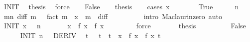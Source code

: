 \begin{isabellebody}
\ INIT\ \isamarkupfalse%
\ {\isacharquery}{\kern0pt}thesis\ \isamarkupfalse%
\ force\isanewline
{}\isamarkupfalse%
\isanewline
\ \ \isamarkupfalse%
\ False\isanewline
\ \ \isamarkupfalse%
\ {\isacharquery}{\kern0pt}thesis\isanewline
\ \ \isamarkupfalse%
\ {\isacharparenleft}{\kern0pt}cases\ {\isachardoublequoteopen}x\ {\isacharequal}{\kern0pt}\ {}{\isachardoublequoteclose}{\isacharparenright}{\kern0pt}\isanewline
\ \ \ \ \isamarkupfalse%
\ True\isanewline
\ \ \ \ \isamarkupfalse%
\ {\isacartoucheopen}n\ {\isasymnoteq}\ {}{\isacartoucheclose}\ \isamarkupfalse%
\ {\isachardoublequoteopen}{\isacharparenleft}{\kern0pt}{\isasymSum}m{\isacharless}{\kern0pt}n{\isachardot}{\kern0pt}\ diff\ m\ {}\ {\isacharslash}{\kern0pt}\ {\isacharparenleft}{\kern0pt}fact\ m{\isacharparenright}{\kern0pt}\ {\isacharasterisk}{\kern0pt}\ x\ {\isacharcircum}{\kern0pt}\ m{\isacharparenright}{\kern0pt}\ {\isacharequal}{\kern0pt}\ diff\ {}\ {}{\isachardoublequoteclose}\isanewline
\ \ \ \ \ \ \isamarkupfalse%
\ {\isacharparenleft}{\kern0pt}intro\ Maclaurin{\isacharunderscore}{\kern0pt}zero{\isacharparenright}{\kern0pt}\ auto\isanewline
\ \ \ \ \isamarkupfalse%
\ INIT\ {\isacartoucheopen}x\ {\isacharequal}{\kern0pt}\ {}{\isacartoucheclose}\ {\isacartoucheopen}n\ {\isasymnoteq}\ {}{\isacartoucheclose}\ \isamarkupfalse%
\ {\isachardoublequoteopen}\ {\isasymbar}{}{\isasymbar}\ {\isasymle}\ {\isasymbar}x{\isasymbar}\ {\isasymand}\ f\ x\ {\isacharequal}{\kern0pt}\ {\isacharquery}{\kern0pt}f\ x\ {}{\isachardoublequoteclose}\isanewline
\ \ \ \ \ \ \isamarkupfalse%
\ force\isanewline
\ \ \ \ \isamarkupfalse%
\ \isamarkupfalse%
\ {\isacharquery}{\kern0pt}thesis\ \isacommand{{\isachardot}{\kern0pt}{\isachardot}{\kern0pt}}\isamarkupfalse%
\isanewline
\ \ \isamarkupfalse%
\isanewline
\ \ \ \ \isamarkupfalse%
\ False\isanewline
\ \ \ \ \isamarkupfalse%
\ INIT\ {\isacartoucheopen}n\ {\isasymnoteq}\ {}{\isacartoucheclose}\ DERIV\ \isamarkupfalse%
\ {\isachardoublequoteopen}{\isasymexists}t{\isachardot}{\kern0pt}\ {}\ {\isacharless}{\kern0pt}\ {\isasymbar}t{\isasymbar}\ {\isasymand}\ {\isasymbar}t{\isasymbar}\ {\isacharless}{\kern0pt}\ {\isasymbar}x{\isasymbar}\ {\isasymand}\ f\ x\ {\isacharequal}{\kern0pt}\ {\isacharquery}{\kern0pt}f\ x\ t{\isachardoublequoteclose}\isanewline

\end{isabellebody}
